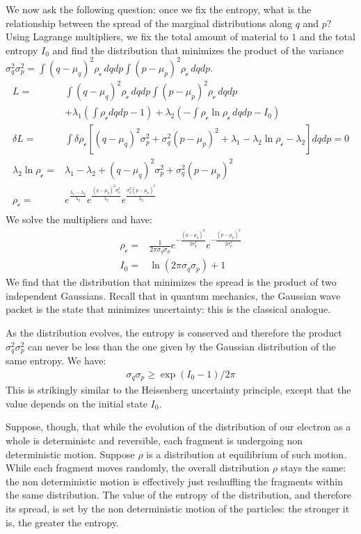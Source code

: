 \documentclass[smallextended]{svjour3}
\numberwithin{equation}{section}
\begin{document}
We now ask the following question: once we fix the entropy, what is the relationship between the spread of the marginal distributions along $q$ and $p$? Using Lagrange multipliers, we fix the total amount of material to $1$ and the total entropy $I_0$ and find the distribution that minimizes the product of the variance $\sigma_q^2 \sigma_p^2 = \int (q-\mu_q)^2 \rho_{\mathcal{c}} \, dqdp \int (p-\mu_p)^2 \rho_{\mathcal{c}} \, dqdp$.
\begin{align*}
L = &\int (q-\mu_q)^2 \rho_{\mathcal{c}} \, dqdp \int (p-\mu_p)^2 \rho_{\mathcal{c}} \, dqdp \\
&+ \lambda_1(\int \rho_{\mathcal{c}} dqdp - 1) + \lambda_2(- \int \rho_{\mathcal{c}} \ln \rho_{\mathcal{c}} \, dqdp - I_0)\\
\delta L = &\int \delta \rho_{\mathcal{c}} [(q-\mu_q)^2 \sigma_p^2 + \sigma_q^2 (p-\mu_p)^2 + \lambda_1 - \lambda_2 \ln \rho_{\mathcal{c}} - \lambda_2 ] dqdp = 0 \\
\lambda_2 \ln \rho_{\mathcal{c}} = &\lambda_1 - \lambda_2 + (q-\mu_q)^2 \sigma_p^2 + \sigma_q^2 (p-\mu_p)^2 \\
\rho_{\mathcal{c}} = &e^{\frac{\lambda_1 - \lambda_2}{\lambda_2}}e^{\frac{(q-\mu_q)^2 \sigma_p^2}{\lambda_2}}e^{\frac{\sigma_q^2 (p-\mu_p)^2}{\lambda_2}}\\
\end{align*}
We solve the multipliers and have:
\begin{align*}
\rho_{\mathcal{c}} = &\frac{1}{ 2 \pi \sigma_q \sigma_p} e^{-\frac{(q-\mu_q)^2}{2\sigma_q^2}} e^{-\frac{(p-\mu_p)^2}{2\sigma_p^2}} \\
I_0 = &\ln (2\pi\sigma_q\sigma_p) + 1
\end{align*}
We find that the distribution that minimizes the spread is the product of two independent Gaussians. Recall that in quantum mechanics, the Gaussian wave packet is the state that minimizes uncertainty: this is the classical analogue.

As the distribution evolves, the entropy is conserved and therefore the product $\sigma_q^2 \sigma_p^2$ can never be less than the one given by the Gaussian distribution of the same entropy. We have:
\begin{align*}
\sigma_q\sigma_p \geq \exp (I_0 - 1) / 2 \pi 
\end{align*}
This is strikingly similar to the Heisenberg uncertainty principle, except that the value depends on the initial state $I_0$.

Suppose, though, that while the evolution of the distribution of our electron as a whole is deterministc and reversible, each fragment is undergoing non deterministic motion. Suppose $\rho$ is a distribution at equilibrium of such motion. While each fragment moves randomly, the overall distribution $\rho$ stays the same: the non deterministic motion is effectively just reshuffling the fragments within the same distribution. The value of the entropy of the distribution, and therefore its spread, is set by the non deterministic motion of the particles: the stronger it is, the greater the entropy.
\end{document}
